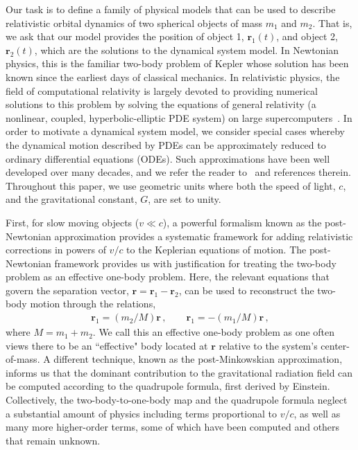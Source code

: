 \documentclass[ reprint,
nofootinbib,
 amsmath,amssymb,
 aps,
]{revtex4-2}
\begin{document}
Our task is to define a family of physical models  that can be used to describe
relativistic orbital dynamics of two spherical objects of mass $m_1$ and $m_2$. That is, we 
ask that our model provides the position of object 1, $\mathbf{r}_1(t)$, and 
object 2, $\mathbf{r}_2(t)$, which 
are the solutions to the dynamical system model. 
In Newtonian physics,
this is the familiar two-body problem of Kepler whose solution has been known since 
the earliest days of classical mechanics.
In relativistic physics, the field of 
computational relativity is largely devoted to providing numerical solutions to this
problem by solving the equations of general
relativity (a nonlinear, coupled, hyperbolic-elliptic PDE system) on
large supercomputers~\cite{lehner2014numerical}. In order to motivate 
a dynamical system model, we consider special cases whereby the 
dynamical motion described by PDEs can be 
approximately reduced to ordinary differential equations (ODEs). 
Such approximations have been well developed over many decades,
and we refer the reader
to~\cite{poisson2014gravity,blanchet2014gravitational,chandrasekhar1998mathematical} 
and references therein. Throughout this paper, 
we use geometric units where both the 
speed of light, $c$, and the gravitational constant, $G$,
are set to unity. 

First, for slow moving
objects ($v \ll c$), a powerful formalism
known as the post-Newtonian approximation
provides a systematic framework for 
adding relativistic corrections in powers of $v/c$ to the Keplerian equations of motion.
The post-Newtonian framework provides us with justification for treating the two-body problem
as an effective one-body problem. Here, the relevant equations that govern the separation
vector, $\mathbf{r} = \mathbf{r}_1 - \mathbf{r}_2$, can be used to reconstruct the two-body motion through
the relations,
\begin{align}
\label{eq:body_map}
\mathbf{r}_1 = (m_2/M) \mathbf{r} \,, \qquad \mathbf{r}_1 = -(m_1/M) \mathbf{r} \,,
\end{align}
where $M = m_1 + m_2$.
We call this an effective one-body problem as one often views there to be an ``effective" body
located at $\mathbf{r}$ relative to the system's center-of-mass.
A different technique, known as the post-Minkowskian approximation, informs us that the dominant 
contribution to the 
gravitational radiation field can be computed according to the quadrupole formula, first derived by Einstein. 
Collectively, the two-body-to-one-body map and the quadrupole formula neglect a
substantial amount of physics including terms proportional to 
$v / c$, as well as many more higher-order terms, some of which have been computed and others that
remain unknown.
\end{document}
